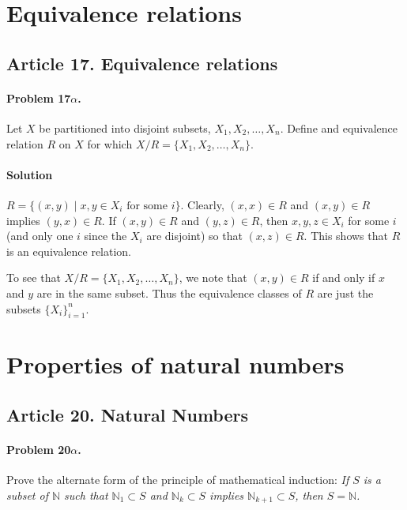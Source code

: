 \section{Equivalence relations}


\subsection{Article 17. Equivalence relations}

\paragraph{Problem 17$\alpha$.}
Let $X$ be partitioned into disjoint subsets, $X_1, X_2, \dots , X_n$. Define
and equivalence relation $R$ on $X$ for which $X/R = \{X_1, X_2, \dots , X_n \}$.

\paragraph*{Solution}
$R = \{ (x,y) \mid x, y \in X_i \mbox{ for some } i \}$. Clearly, $(x,x) \in R$ and
$(x,y) \in R$ implies $(y,x) \in R$. If $(x,y) \in R$ and $(y,z) \in R$, then
$x,y,z \in X_i$ for some $i$ (and only one $i$ since the $X_i$ are disjoint) so that
$(x,z) \in R$. This shows that $R$ is an equivalence relation.

To see that $X/R = \{X_1, X_2, \dots , X_n\}$, we note that $(x,y) \in R$ if and
only if $x$ and $y$ are in the same subset. Thus the equivalence classes of $R$
are just the subsets $\{X_i\}_{i=1}^{n}$.


\section{Properties of natural numbers}


\subsection{Article 20. Natural Numbers}

\paragraph{Problem 20$\alpha$.}
Prove the alternate form of the principle of mathematical induction: \textit{If
$S$ is a subset of $\mathbb{N}$ such that $\mathbb{N}_1 \subset S$ and
$\mathbb{N}_k \subset S$ implies $\mathbb{N}_{k+1} \subset S$, then $S = \mathbb{N}$.}

